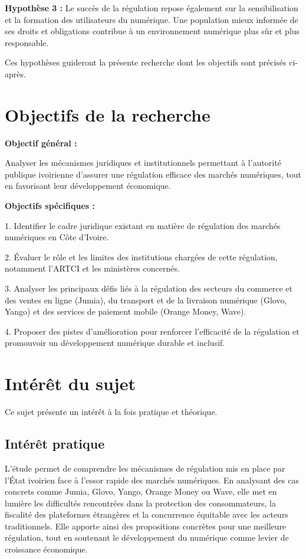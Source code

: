 \textbf{Hypothèse 3 :}
Le succès de la régulation repose également sur la sensibilisation et la formation des utilisateurs du numérique.
Une population mieux informée de ses droits et obligations contribue à un environnement numérique plus sûr et plus responsable.

Ces hypothèses guideront la présente recherche dont les objectifs sont précisés ci-après.

\section*{Objectifs de la recherche}

\textbf{Objectif général :}

Analyser les mécanismes juridiques et institutionnels permettant à l’autorité publique ivoirienne d’assurer une régulation efficace des marchés numériques, tout en favorisant leur développement économique.

\textbf{Objectifs spécifiques :}

1. Identifier le cadre juridique existant en matière de régulation des marchés numériques en Côte d’Ivoire.

2. Évaluer le rôle et les limites des institutions chargées de cette régulation, notamment l’ARTCI et les ministères concernés.

3. Analyser les principaux défis liés à la régulation des secteurs du commerce et des ventes en ligne (Jumia), du transport et de la livraison numérique (Glovo, Yango) et des services de paiement mobile (Orange Money, Wave).

4. Proposer des pistes d’amélioration pour renforcer l’efficacité de la régulation et promouvoir un développement numérique durable et inclusif.

\section*{Intérêt du sujet}

Ce sujet présente un intérêt à la fois pratique et théorique.

\subsection*{Intérêt pratique}

L’étude permet de comprendre les mécanismes de régulation mis en place par l’État ivoirien face à l’essor rapide des marchés numériques. En analysant des cas concrets comme Jumia, Glovo, Yango, Orange Money ou Wave, elle met en lumière les difficultés rencontrées dans la protection des consommateurs, la fiscalité des plateformes étrangères et la concurrence équitable avec les acteurs traditionnels.
Elle apporte ainsi des propositions concrètes pour une meilleure régulation, tout en soutenant le développement du numérique comme levier de croissance économique.


